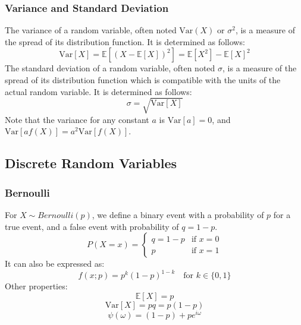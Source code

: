\documentclass[twoside,twocolumn]{article}
\begin{document}
\subsubsection{Variance and Standard Deviation}
The variance of a random variable, often noted $\mbox{Var}(X)$ or $\sigma^2$,
is a measure of the spread of its distribution function.
It is determined as follows:
\begin{equation}
  \mbox{Var}[X]=\mathbb { E }[(X-\mathbb { E }[X])^2]=\mathbb { E }[X^2]-\mathbb { E }[X]^2
\end{equation}
The standard deviation of a random variable, often noted $\sigma$, is a
measure of the spread of its distribution function which is
compatible with the units of the actual random variable.
It is determined as follows:
\begin{equation}
  \sigma = \sqrt{\mbox{Var}[X]}
\end{equation}
Note that the variance for any constant $a$ is $\mbox{Var}[a]= 0$, and
$\mbox{Var}[af(X)]=a^2\mbox{Var}[f(X)]$.
\subsection{Discrete Random Variables}
\subsubsection{Bernoulli}
For $X\sim Bernoulli(p)$, we define a binary event with a probability of $p$
for a true event, and a false event with probability of $q=1-p$.
\begin{equation}
  P(X=x) = \begin{cases} q=1-p & \textrm{if } x=0 \\ p & \textrm{if } x=1 \end{cases}
\end{equation}
It can also be expressed as:
\begin{equation}
  f(x; p) = p^k (1-p)^{1-k} \quad \mbox{for } k\in \{0, 1\}
\end{equation}
Other properties:
\begin{equation}
  \mathbb { E }[X] = p
\end{equation}
\begin{equation}
  \mbox{Var}[X] = pq = p (1-p)
\end{equation}
\begin{equation}
  \psi(\omega) = (1-p) + p e^{i\omega}
\end{equation}
\end{document}
